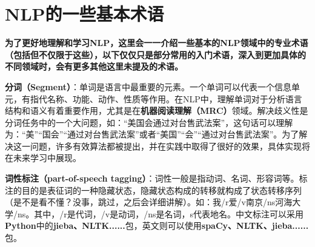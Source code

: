 \documentclass[UTF8]{ctexart}
\begin{document}

\section{NLP的一些基本术语}
\textbf{为了更好地理解和学习NLP，这里会一一介绍一些基本的NLP领域中的专业术语（包括但不仅限于这些），以下仅仅只是部分常用的入门术语，深入到更加具体的不同领域时，会有更多其他这里未提及的术语。}
\label{definitions}
\begin{enumerate}
\begin{item}
	\textbf{分词（Segment）}：单词是语言中最重要的元素。一个单词可以代表一个信息单元，有指代名称、功能、动作、性质等作用。在NLP中，理解单词对于分析语言结构和语义有着重要作用，尤其是在\textbf{机器阅读理解（MRC）}领域。解决歧义性是分词任务中的一个大问题，如：“美国会通过对台售武法案”，这句话可以理解为：“美”“国会”“通过对台售武法案”或者“美国”“会”“通过对台售武法案”。为了解决这一问题，许多有效算法都被提出，并在实践中取得了很好的效果，具体实现将在未来学习中展现。
\end{item}
\begin{item}
	\textbf{词性标注（part-of-speech tagging）}：词性一般是指动词、名词、形容词等。标注的目的是表征词的一种隐藏状态，隐藏状态构成的转移就构成了状态转移序列（是不是看不懂？没事，跳过，之后会详细讲解）。如：我/r爱/v南京/ns河海大学/ns。其中，/r是代词，/v是动词，/ns是名词，s代表地名。中文标注可以采用\textbf{Python}中的\textbf{jieba、NLTK......}包，英文则可以使用\textbf{spaCy、NLTK、jieba......}包。
\end{item}


\end{enumerate}
\end{document}
